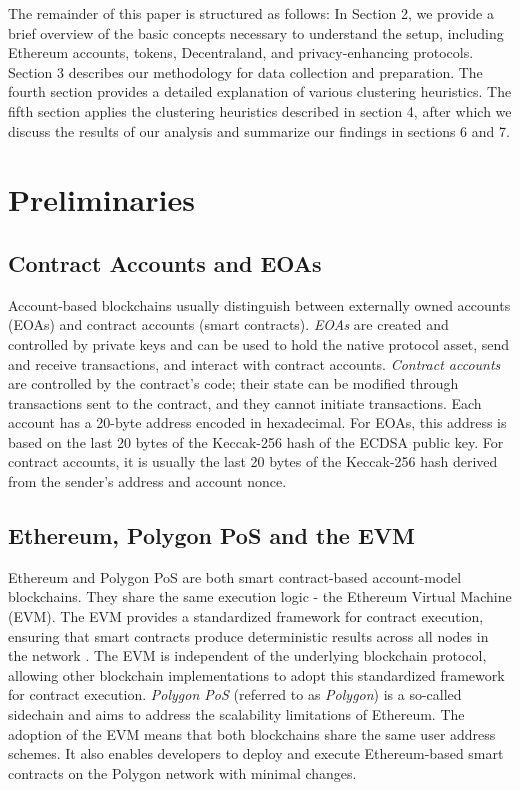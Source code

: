 \documentclass[12pt,a4paper,titlepage,oneside,english]{article}
\begin{document}
The remainder of this paper is structured as follows: In Section 2, we provide a brief overview of the basic concepts necessary to understand the setup, including Ethereum accounts, tokens, Decentraland, and privacy-enhancing protocols. Section 3 describes our methodology for data collection and preparation. The fourth section provides a detailed explanation of various clustering heuristics. The fifth section applies the clustering heuristics described in section 4, after which we discuss the results of our analysis and summarize our findings in sections 6 and 7.



\section{Preliminaries}

\subsection{Contract Accounts and EOAs}
Account-based blockchains usually distinguish between externally owned accounts (EOAs) and contract accounts (smart contracts). \textit{EOAs} are created and controlled by private keys and can be used to hold the native protocol asset, send and receive transactions, and interact with contract accounts. \textit{Contract accounts} are controlled by the contract's code; their state can be modified through transactions sent to the contract, and they cannot initiate transactions. \citep{buterin2014ethereum} \newline Each account has a 20-byte address encoded in hexadecimal. For EOAs, this address is based on the last 20 bytes of the Keccak-256 hash of the ECDSA public key. For contract accounts, it is usually the last 20 bytes of the Keccak-256 hash derived from the sender's address and account nonce. \citep{GW:14}

\subsection{Ethereum, Polygon PoS and the EVM}
Ethereum and Polygon PoS are both smart contract-based account-model blockchains. They share the same execution logic - the Ethereum Virtual Machine (EVM).
The EVM provides a standardized framework for contract execution, ensuring that smart contracts produce deterministic results across all nodes in the network \citep{GW:14}. The EVM is independent of the underlying blockchain protocol, allowing other blockchain implementations to adopt this standardized framework for contract execution.\newline
\textit{Polygon PoS} (referred to as \textit{Polygon}) is a so-called sidechain and aims to address the scalability limitations of Ethereum. The adoption of the EVM means that both blockchains share the same user address schemes. It also enables developers to deploy and execute Ethereum-based smart contracts on the Polygon network with minimal changes. \citep{matic_whitepaper}
\end{document}
